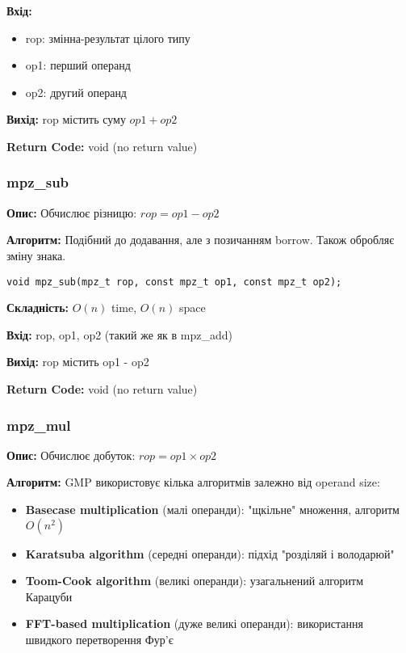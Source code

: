 \textbf{Вхід:}
\begin{itemize}
    \item rop: змінна-результат цілого типу
    \item op1: перший операнд
    \item op2: другий операнд
\end{itemize}

\textbf{Вихід:} rop містить суму $op1 + op2$

\textbf{Return Code:} void (no return value)

\subsubsection{mpz\_sub}
\textbf{Опис:} Обчислює різницю: $rop = op1 - op2$

\textbf{Алгоритм:} Подібний до додавання, але з позичанням borrow. Також обробляє зміну знака.

\begin{verbatim}
void mpz_sub(mpz_t rop, const mpz_t op1, const mpz_t op2);
\end{verbatim}

\textbf{Складність:} $O(n)$ time, $O(n)$ space

\textbf{Вхід:} rop, op1, op2 (такий же як в mpz\_add)

\textbf{Вихід:} rop містить op1 - op2

\textbf{Return Code:} void (no return value)

\subsubsection{mpz\_mul}
\textbf{Опис:} Обчислює добуток: $rop = op1 \times op2$

\textbf{Алгоритм:} GMP використовує кілька алгоритмів залежно від operand size:
\begin{itemize}
    \item \textbf{Basecase multiplication} (малі операнди): "щкільне"{} множення, алгоритм $O(n^{2})$
    \item \textbf{Karatsuba algorithm} (середні операнди): підхід "розділяй і володарюй"{}
    \item \textbf{Toom-Cook algorithm} (великі операнди): узагальнений алгоритм Карацуби
    \item \textbf{FFT-based multiplication} (дуже великі операнди): використання швидкого перетворення Фур'є
\end{itemize}

